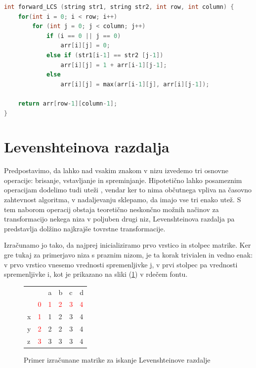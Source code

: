 \documentclass[a4paper,12pt,openright]{book}
\begin{document}
\begin{lstlisting}[language=C++, caption={Algoritem LCS naprej}, captionpos=b, label=LCSnaprej]
int forward_LCS (string str1, string str2, int row, int column) {
    for(int i = 0; i < row; i++) 
        for (int j = 0; j < column; j++) 
            if (i == 0 || j == 0)
                arr[i][j] = 0;
            else if (str1[i-1] == str2 [j-1])
                arr[i][j] = 1 + arr[i-1][j-1];
            else
                arr[i][j] = max(arr[i-1][j], arr[i][j-1]);

    return arr[row-1][column-1];
}
\end{lstlisting}

\section{Levenshteinova razdalja}

Predpostavimo, da lahko nad vsakim znakom v nizu izvedemo tri osnovne operacije: brisanje, vstavljanje in spreminjanje. Hipotetično lahko posameznim operacijam dodelimo tudi uteži \cite{weightedLevenshtein}, vendar ker to nima občutnega vpliva na časovno zahtevnost algoritma, v nadaljevanju sklepamo, da imajo vse tri enako utež. S tem naborom operacij obstaja teoretično neskončno možnih načinov za transformacijo nekega niza v poljuben drugi niz, Levenshteinova razdalja pa predstavlja dolžino najkrajše tovrstne transformacije. 

Izračunamo jo tako, da najprej inicializiramo prvo vrstico in stolpec matrike. Ker gre tukaj za primerjavo niza s praznim nizom, je ta korak trivialen in vedno enak: v prvo vrstico vnesemo vrednosti spremenljivke j, v prvi stolpec pa vrednosti spremenljivke i, kot je prikazano na sliki (\ref{levenshteinExample}) v rdečem fontu. 

\begin{figure}[htb]
\begin{center}
\begin{tabular}{|l|l|l|l|l|l|}
\cline{3-6}
  \multicolumn{2}{c|}{}  & a & b & c & d\\ \cline{2-6}
 \multicolumn{1}{c|}{} & \textcolor{red}{0} & \textcolor{red}{1} & \textcolor{red}{2} & \textcolor{red}{3} & \textcolor{red}{4}\\ \hline
x  & \textcolor{red}{1}  & \cellcolor{blue!15}1 &  2 & 3 & 4\\ \hline
y  & \textcolor{red}{2} & 2 & \cellcolor{blue!15}2 & 3 & 4\\ \hline
z  & \textcolor{red}{3} & 3 & 3 & \cellcolor{blue!15}3 & \cellcolor{blue!25}4 \\ \hline
\end{tabular}

\end{center}
\caption{Primer izračunane matrike za iskanje Levenshteinove razdalje}
\label{levenshteinExample}
\end{figure}
\end{document}
